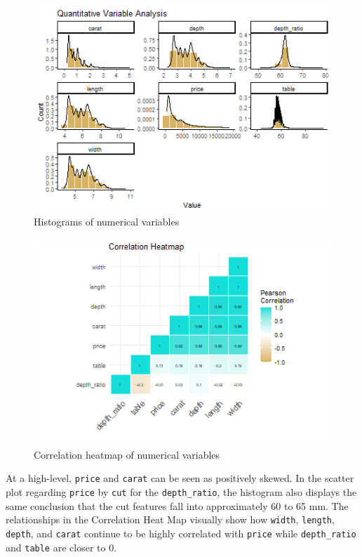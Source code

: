 \documentclass[
  paper=a4,
  ,captions=tableheading
]{scrartcl}
\begin{document}
\begin{figure}[H]

{\centering \includegraphics[width=\linewidth,]{Diamonds_PDF_files/figure-latex/Histograms-1}

}

\caption{Histograms of numerical variables}\label{fig:Histograms}
\end{figure}

\begin{figure}[H]

{\centering \includegraphics[width=0.5\linewidth,]{Diamonds_PDF_files/figure-latex/Correlation-1}

}

\caption{Correlation heatmap of numerical variables}\label{fig:Correlation}
\end{figure}

At a high-level, \texttt{price} and \texttt{carat} can be seen as
positively skewed. In the scatter plot regarding \texttt{price} by
\texttt{cut} for the \texttt{depth\_ratio}, the histogram also displays
the same conclusion that the cut features fall into approximately 60 to
65 mm. The relationships in the Correlation Heat Map visually show how
\texttt{width}, \texttt{length}, \texttt{depth}, and \texttt{carat}
continue to be highly correlated with \texttt{price} while
\texttt{depth\_ratio} and \texttt{table} are closer to 0.
\end{document}
